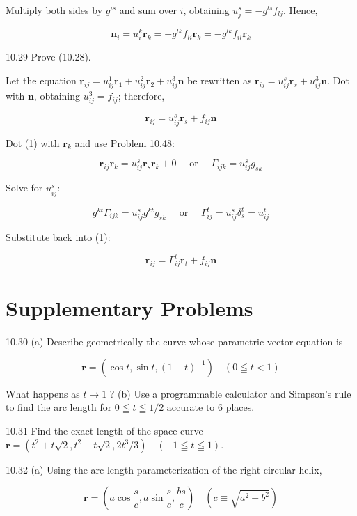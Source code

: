 \documentclass[10pt]{article}
\begin{document}
Multiply both sides by $g^{i s}$ and sum over $i$, obtaining $u_{j}^{s}=-g^{l s} f_{l j}$. Hence,

$$
\mathbf{n}_{i}=u_{i}^{k} \mathbf{r}_{k}=-g^{l k} f_{l i} \mathbf{r}_{k}=-g^{l k} f_{i l} \mathbf{r}_{k}
$$

10.29 Prove (10.28).

Let the equation $\mathbf{r}_{i j}=u_{i j}^{1} \mathbf{r}_{1}+u_{i j}^{2} \mathbf{r}_{2}+u_{i j}^{3} \mathbf{n}$ be rewritten as $\mathbf{r}_{i j}=u_{i j}^{s} \mathbf{r}_{s}+u_{i j}^{3} \mathbf{n}$. Dot with $\mathbf{n}$, obtaining $u_{i j}^{3}=f_{i j}$; therefore,


\begin{equation*}
\mathbf{r}_{i j}=u_{i j}^{s} \mathbf{r}_{s}+f_{i j} \mathbf{n} \tag{1}
\end{equation*}


Dot (1) with $\mathbf{r}_{k}$ and use Problem 10.48:

$$
\mathbf{r}_{i j} \mathbf{r}_{k}=u_{i j}^{s} \mathbf{r}_{s} \mathbf{r}_{k}+0 \quad \text { or } \quad \Gamma_{i j k}=u_{i j}^{s} g_{s k}
$$

Solve for $u_{i j}^{s}:$

$$
g^{k t} \Gamma_{i j k}=u_{i j}^{s} g^{k t} g_{s k} \quad \text { or } \quad \Gamma_{i j}^{t}=u_{i j}^{s} \delta_{s}^{t}=u_{i j}^{t}
$$

Substitute back into (1):

$$
\mathbf{r}_{i j}=\Gamma_{i j}^{t} \mathbf{r}_{t}+f_{i j} \mathbf{n}
$$

\section*{Supplementary Problems}
10.30 (a) Describe geometrically the curve whose parametric vector equation is

$$
\mathbf{r}=\left(\cos t, \sin t,(1-t)^{-1}\right) \quad(0 \leqq t<1)
$$

What happens as $t \rightarrow 1$ ? (b) Use a programmable calculator and Simpson's rule to find the arc length for $0 \leqq t \leqq 1 / 2$ accurate to 6 places.

10.31 Find the exact length of the space curve $\mathbf{r}=\left(t^{2}+t \sqrt{2}, t^{2}-t \sqrt{2}, 2 t^{3} / 3\right) \quad(-1 \leqq t \leqq 1)$.

10.32 (a) Using the arc-length parameterization of the right circular helix,

$$
\mathbf{r}=\left(a \cos \frac{s}{c}, a \sin \frac{s}{c}, \frac{b s}{c}\right) \quad\left(c \equiv \sqrt{a^{2}+b^{2}}\right)
$$
\end{document}
